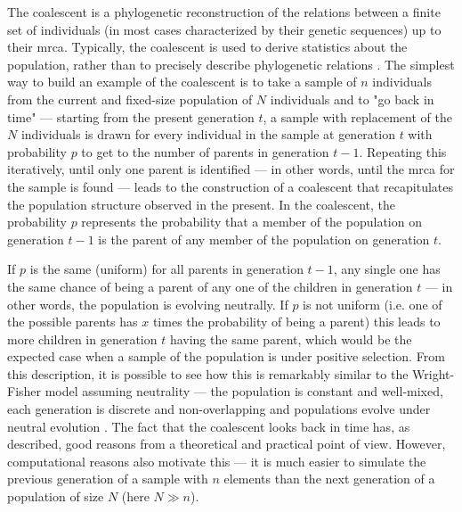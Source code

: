 The coalescent is a phylogenetic reconstruction of the relations between a finite set of individuals (in most cases characterized by their genetic sequences) up to their \ac{mrca}. Typically, the coalescent is used to derive statistics about the population, rather than to precisely describe phylogenetic relations \cite{Gillespie2004-xo}. The simplest way to build an example of the coalescent is to take a sample of $n$ individuals from the current and fixed-size population of $N$ individuals and to "go back in time" --- starting from the present generation $t$, a sample with replacement of the $N$ individuals is drawn for every individual in the sample at generation $t$ with probability $p$ to get to the number of parents in generation $t-1$. Repeating this iteratively, until only one parent is identified --- in other words, until the \ac{mrca} for the sample is found --- leads to the construction of a coalescent that recapitulates the population structure observed in the present. In the coalescent, the probability $p$ represents the probability that a member of the population on generation $t-1$ is the parent of any member of the population on generation $t$.

If $p$ is the same (uniform) for all parents in generation $t-1$, any single one has the same chance of being a parent of any one of the children in generation $t$ --- in other words, the population is evolving neutrally. If $p$ is not uniform (i.e. one of the possible parents has $x$ times the probability of being a parent) this leads to more children in generation $t$ having the same parent, which would be the expected case when a sample of the population is under positive selection. From this description, it is possible to see how this is remarkably similar to the Wright-Fisher model assuming neutrality --- the population is constant and well-mixed, each generation is discrete and non-overlapping and populations evolve under neutral evolution \cite{Gillespie2004-xo}. The fact that the coalescent looks back in time has, as described, good reasons from a theoretical and practical point of view. However, computational reasons also motivate this --- it is much easier to simulate the previous generation of a sample with $n$ elements than the next generation of a population of size $N$ (here $N \gg n$).

